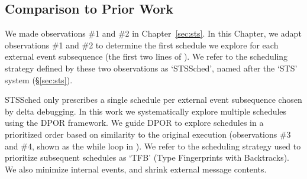 \subsection{Comparison to Prior Work}

We made observations \#1 and \#2 in Chapter~\ref{sec:sts}. In this
Chapter, we adapt observations \#1 and \#2 to determine the first schedule we
explore for each external event subsequence (the first two lines of ). We refer
to the scheduling strategy defined by these two observations as `STSSched', named
after the `STS' system (\S\ref{sec:sts}).

STSSched only prescribes a single schedule per external event subsequence
chosen by delta debugging. In
this work we systematically explore multiple schedules using the DPOR
framework. We guide DPOR to explore schedules in a prioritized order based on similarity to the original execution
(observations \#3 and \#4, shown as the while loop in ).
We refer to the scheduling strategy used to prioritize subsequent schedules as `TFB' (Type Fingerprints with Backtracks).
We also minimize internal events, and shrink external message contents.


%
%

